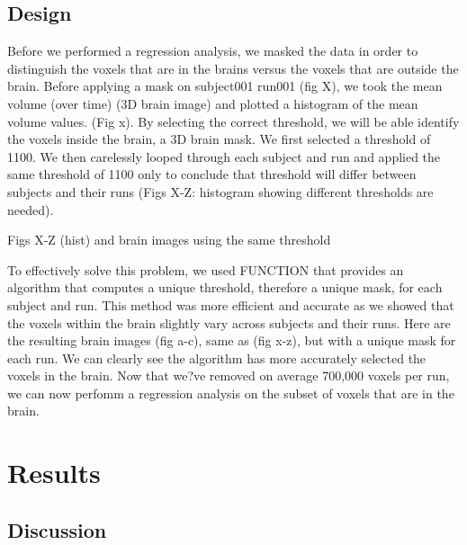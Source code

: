 \documentclass[11pt]{article}
\begin{document}
\subsection{Design}
Before we performed a regression analysis, we masked the data in order to distinguish the voxels that are in the brains versus the voxels that are outside the brain. Before applying a mask on subject001 run001 (fig X), we took the mean volume (over time) (3D brain image) and plotted a histogram of the mean volume values. (Fig x). By selecting the correct threshold, we will be able identify the voxels inside the brain, a 3D brain mask. We first selected a threshold of 1100. We then carelessly looped through each subject and run and applied the same threshold of 1100 only to conclude that threshold will differ between subjects and their runs (Figs X-Z: histogram showing different thresholds are needed). 

                                                  Figs X-Z (hist)
                                                   and brain images using the same threshold

To effectively solve this problem, we used FUNCTION that provides an algorithm that computes a unique threshold, therefore a unique mask, for each subject and run. This method was more efficient and accurate as we showed that the voxels within the brain slightly vary  across subjects and their runs. Here are the resulting brain images (fig a-c), same as (fig x-z), but with a unique mask for each run. We can clearly see the algorithm has  more accurately selected the voxels in the brain. Now that we?ve removed on average 700,000 voxels per run, we can now perfomm a regression analysis on the subset of voxels that are in the brain.              
\subsection{}

\subsection{}



\section{Results}

\subsection{Discussion}
\end{document}
